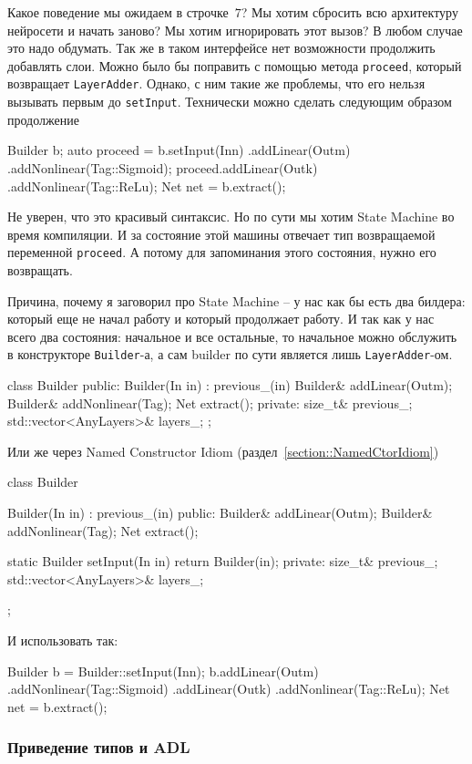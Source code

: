 Какое поведение мы ожидаем в строчке~$7$?
Мы хотим сбросить всю архитектуру нейросети и начать заново?
Мы хотим игнорировать этот вызов?
В любом случае это надо обдумать.
Так же в таком интерфейсе нет возможности продолжить добавлять слои.
Можно было бы поправить с помощью метода \verb"proceed", который возвращает \verb"LayerAdder".
Однако, с ним такие же проблемы, что его нельзя вызывать первым до \verb"setInput".
Технически можно сделать следующим образом продолжение
\begin{cppcode}
Builder b;
auto proceed = b.setInput(In{n})
                .addLinear(Out{m})
                .addNonlinear(Tag::Sigmoid);
proceed.addLinear(Out{k})
       .addNonlinear(Tag::ReLu);
Net net = b.extract();
\end{cppcode}
Не уверен, что это красивый синтаксис.
Но по сути мы хотим State Machine во время компиляции.
И за состояние этой машины отвечает тип возвращаемой переменной \verb"proceed".
А потому для запоминания этого состояния, нужно его возвращать.

Причина, почему я заговорил про State Machine -- у нас как бы есть два билдера: который еще не начал работу и который продолжает работу.
И так как у нас всего два состояния: начальное и все остальные, то начальное можно обслужить в конструкторе \verb"Builder"-а, а сам builder по сути является лишь \verb"LayerAdder"-ом.
\begin{cppcode}
class Builder {
public:
  Builder(In in) : previous_(in) {}
  Builder& addLinear(Out{m});
  Builder& addNonlinear(Tag);
  Net extract();
private:
  size_t& previous_;
  std::vector<AnyLayers>& layers_;
};
\end{cppcode}
Или же через Named Constructor Idiom (раздел~\ref{section::NamedCtorIdiom})
\begin{cppcode}
class Builder {
  Builder(In in) : previous_(in) {}
public:
  Builder& addLinear(Out{m});
  Builder& addNonlinear(Tag);
  Net extract();
  
  static Builder setInput(In in) {
    return Builder(in);
  }
private:
  size_t& previous_;
  std::vector<AnyLayers>& layers_;
};
\end{cppcode}
И использовать так:
\begin{cppcode}
Builder b = Builder::setInput(In{n});
b.addLinear(Out{m})
 .addNonlinear(Tag::Sigmoid)
 .addLinear(Out{k})
 .addNonlinear(Tag::ReLu);
Net net = b.extract();
\end{cppcode}

\subsubsection{Приведение типов и ADL}

